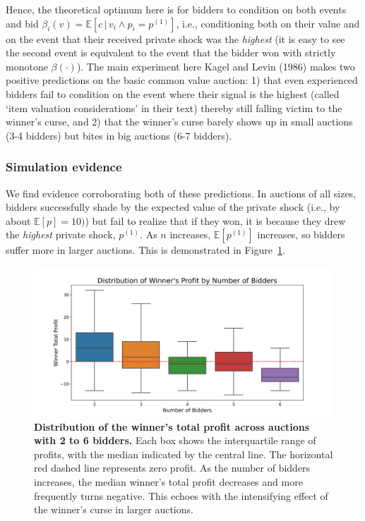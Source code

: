\documentclass{article} %
\begin{document}
Hence, the theoretical optimum here is for bidders to condition on both events and bid $\beta_i(v) = \mathbb{E}[c \, | \, v_i \wedge p_i = p^{(1)}]$, i.e., conditioning both on their value and on the event that their received private shock was the \textit{highest} (it is easy to see the second event is equivalent to the event that the bidder won with strictly monotone $\beta(\cdot)$). 
The main experiment here Kagel and Levin (1986) makes two positive predictions on the basic common value auction: 1) that even experienced bidders fail to condition on the event where their signal is the highest (called `item valuation considerations' in their text) thereby still falling victim to the winner's curse, and 2) that the winner's curse barely shows up in small auctions (3-4 bidders) but bites in big auctions (6-7 bidders). 

\subsubsection{Simulation evidence}
We find evidence corroborating both of these predictions. In auctions of all sizes, bidders successfully shade by the expected value of the private shock (i.e., by about $\mathbb{E}[p] = 10)$) but fail to realize that if they won, it is because they drew the \textit{highest} private shock, $p^{(1)}$. As $n$ increases, $\mathbb{E}[p^{(1)}]$ increases, so bidders suffer more in larger auctions. This is demonstrated in Figure~\ref{fig:winner}. 

\begin{figure}[h]  %
    
    \centering  %
    \includegraphics[width=\linewidth]{Figs/cv_plot.png}  %
    \caption{\textbf{Distribution of the winner’s total profit across auctions with 2 to 6 bidders.} Each box shows the interquartile range of profits, with the median indicated by the central line. The horizontal red dashed line represents zero profit. As the number of bidders increases, the median winner's total profit decreases and more frequently turns negative. This echoes with the intensifying effect of the winner's curse in larger auctions.}
    \label{fig:winner}

\end{figure}
\end{document}
